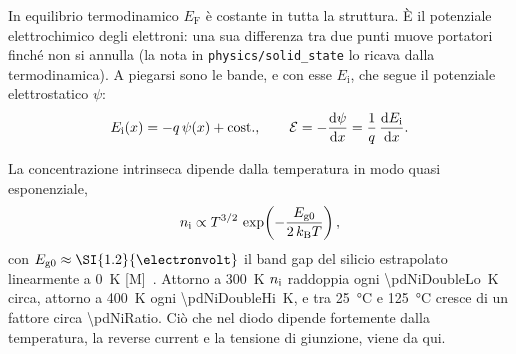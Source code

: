 \documentclass[10pt,a4paper]{scrartcl}
\let\newcommand\pdvaluedefine
\newcommand{\diff}{\mathrm{d}}
\newcommand{\Ef}{\mathcal{E}}                 %
\newcommand{\nint}{n_\mathrm{i}}
\newcommand{\kB}{k_\mathrm{B}}
\begin{document}
In equilibrio termodinamico $E_\mathrm{F}$ è costante in tutta la struttura. È il potenziale elettrochimico degli elettroni: una sua differenza tra due punti muove portatori finché non si annulla (la nota in \texttt{physics/solid\_state} lo ricava dalla termodinamica). A piegarsi sono le bande, e con esse $E_\mathrm{i}$, che segue il potenziale elettrostatico $\psi$:
\begin{equation}
E_\mathrm{i}(x) = -q\,\psi(x) + \text{cost.} , \qquad \Ef = -\frac{\diff\psi}{\diff x} = \frac{1}{q}\,\frac{\diff E_\mathrm{i}}{\diff x} .
\label{eq:potential}
\end{equation}

La concentrazione intrinseca dipende dalla temperatura in modo quasi esponenziale,
\begin{equation}
\nint \propto T^{3/2}\,\exp\!\left(-\frac{E_\mathrm{g0}}{2\,\kB T}\right) ,
\label{eq:ni}
\end{equation}
con $E_\mathrm{g0} \approx \SI{\pdEgZero}{\electronvolt}$ il band gap del silicio estrapolato linearmente a \SI{0}{\kelvin} [M]~\cite{sze}. Attorno a \SI{300}{\kelvin} $\nint$ raddoppia ogni \SI{\pdNiDoubleLo}{\kelvin} circa, attorno a \SI{400}{\kelvin} ogni \SI{\pdNiDoubleHi}{\kelvin}, e tra \SI{25}{\celsius} e \SI{125}{\celsius} cresce di un fattore circa \num{\pdNiRatio}. Ciò che nel diodo dipende fortemente dalla temperatura, la reverse current e la tensione di giunzione, viene da qui.
\end{document}
